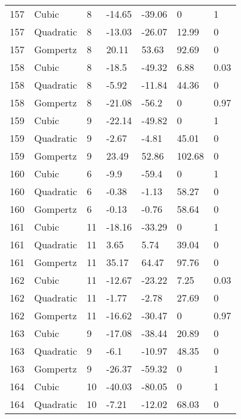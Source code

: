 \documentclass[11pt]{article}
\begin{document}
\begin{center}
\begin{longtable}{lllllll}
    157 & Cubic     & 8               & -14.65  & -39.06  & 0       & 1    \\
    157 & Quadratic & 8               & -13.03  & -26.07  & 12.99   & 0    \\
    157 & Gompertz  & 8               & 20.11   & 53.63   & 92.69   & 0    \\
    158 & Cubic     & 8               & -18.5   & -49.32  & 6.88    & 0.03 \\
    158 & Quadratic & 8               & -5.92   & -11.84  & 44.36   & 0    \\
    158 & Gompertz  & 8               & -21.08  & -56.2   & 0       & 0.97 \\
    159 & Cubic     & 9               & -22.14  & -49.82  & 0       & 1    \\
    159 & Quadratic & 9               & -2.67   & -4.81   & 45.01   & 0    \\
    159 & Gompertz  & 9               & 23.49   & 52.86   & 102.68  & 0    \\
    160 & Cubic     & 6               & -9.9    & -59.4   & 0       & 1    \\
    160 & Quadratic & 6               & -0.38   & -1.13   & 58.27   & 0    \\
    160 & Gompertz  & 6               & -0.13   & -0.76   & 58.64   & 0    \\
    161 & Cubic     & 11              & -18.16  & -33.29  & 0       & 1    \\
    161 & Quadratic & 11              & 3.65    & 5.74    & 39.04   & 0    \\
    161 & Gompertz  & 11              & 35.17   & 64.47   & 97.76   & 0    \\
    162 & Cubic     & 11              & -12.67  & -23.22  & 7.25    & 0.03 \\
    162 & Quadratic & 11              & -1.77   & -2.78   & 27.69   & 0    \\
    162 & Gompertz  & 11              & -16.62  & -30.47  & 0       & 0.97 \\
    163 & Cubic     & 9               & -17.08  & -38.44  & 20.89   & 0    \\
    163 & Quadratic & 9               & -6.1    & -10.97  & 48.35   & 0    \\
    163 & Gompertz  & 9               & -26.37  & -59.32  & 0       & 1    \\
    164 & Cubic     & 10              & -40.03  & -80.05  & 0       & 1    \\
    164 & Quadratic & 10              & -7.21   & -12.02  & 68.03   & 0    \\

\end{longtable}
\end{center}
\end{document}
